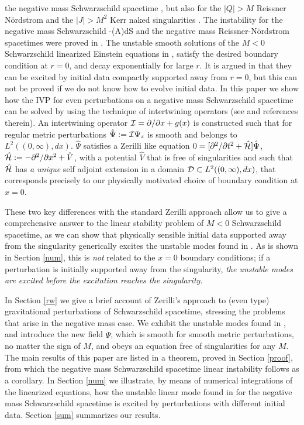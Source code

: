 \documentclass[aps,floats,showpacs,amssymb,tightenlines]{revtex4}
\def\p{\partial}
\def\I{{\cal I}}
\begin{document}
 the negative mass Schwarzschild spacetime \cite{dg}, but also for the $|Q|>M$ Reissner N\"ordstrom 
 and the $|J| >M^2$ Kerr naked singularities \cite{dgp,dgsv}. The instability for the negative mass Schwarzschild -(A)dS 
and the negative mass Reissner-N\"ordstrom spacetimes were proved in \cite{cardo}.
The unstable smooth solutions of the $M<0$ Schwarzschild 
 linearized Einstein equations in \cite{dg}, satisfy the desired
boundary condition at $r=0$, and decay exponentially  for large $r$.
It is  argued  in \cite{dg} 
that they can be excited  by initial data  compactly supported
away from $r=0$, but this can not be proved if we do not know how to evolve initial data.
In this paper we show how the IVP for  even
perturbations on a negative mass Schwarzschild spacetime can be solved by using the technique of intertwining operators
 (see \cite{price} and references therein).
An intertwining operator $\I= \p/\p x + g(x)$ is constructed such that for
 regular metric perturbations $\hat \Psi := \I \Psi_z $
is smooth and belongs to
$L^2((0,\infty),dx)$.
$\hat \Psi$ satisfies a Zerilli like equation $0= [\p^2 /\p t^2 +\hat {\cal H} ] \hat \Psi$, $\hat {\cal H} :=
 - \p^2/\p x^2 + \hat V$,
with a potential $\hat V$ that is  free of  singularities and such that $\hat {\cal H}$ has  {\em a unique}
self adjoint extension in a domain ${\cal D} \subset L^2((0,\infty),dx)$, that corresponds precisely
 to our physically motivated choice of boundary condition at $x=0$.

These two key differences with the standard Zerilli approach allow us to give a
 comprehensive answer to the linear stability problem
of $M<0$ Schwarzschild spacetime, as we can show that physically sensible initial
 data supported away from the singularity generically
excites the unstable modes found in \cite{dg}. As is shown in Section \ref{num}, 
this is {\em not} related to the $x=0$ boundary
conditions; if a perturbation is initially supported away
 from the singularity, {\em the unstable modes are excited before the excitation reaches the singularity.}

In Section \ref{rw} we give a brief account of Zerilli's approach to (even type)
 gravitational perturbations of Schwarzschild spacetime, stressing the problems that
 arise in the negative mass case. We exhibit the unstable modes found in \cite{dg}, 
and introduce the new field $\hat { \Psi}$, which is smooth for smooth metric perturbations, 
no matter the sign of $M$, and obeys an equation free of  singularities
for any  $M$.
The main results of this paper are listed in a theorem, proved in Section \ref{proof}, from which 
 the negative mass Schwarzschild spacetime linear instability follows as a corollary.
In Section \ref{num} we illustrate, by means of numerical integrations of the
 linearized equations, how the unstable linear mode found in \cite{dg} for the
 negative mass Schwarzschild spacetime is excited by  perturbations with different initial data.
Section \ref{sum} summarizes our results.
\end{document}
